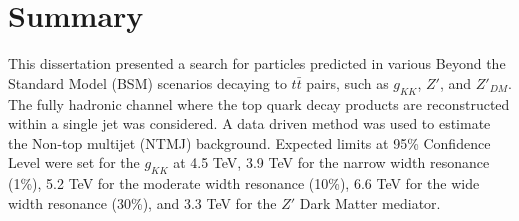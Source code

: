 \clearpage


\section{Summary}


This dissertation presented a search for particles predicted in various Beyond the Standard Model (BSM) scenarios decaying to $t\bar{t}$ pairs, such as $g_{KK}$, $Z'$, and $Z'_{DM}$. The fully hadronic channel where the top quark decay products are reconstructed within a single jet was considered. A data driven method was used to estimate the Non-top multijet (NTMJ) background. Expected limits at 95\% Confidence Level were set for the $g_{KK}$ at 4.5 TeV, 3.9 TeV for the narrow width resonance (1\%), 5.2 TeV for the moderate width resonance (10\%), 6.6 TeV for the wide width resonance (30\%), and 3.3 TeV for the $Z'$ Dark Matter mediator. 











